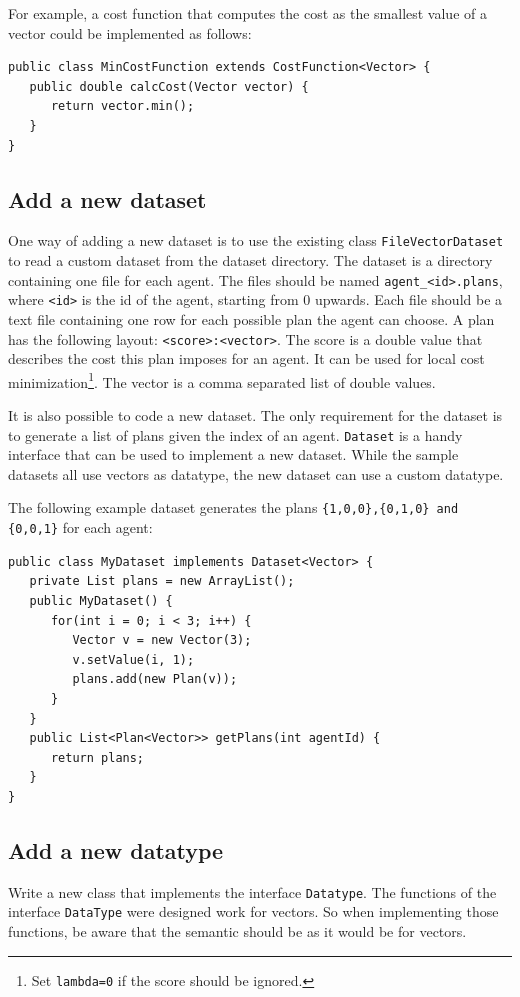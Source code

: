 \documentclass[11pt]{article} %
\newcommand{\code}{\texttt}
\begin{document}
For example, a cost function that computes the cost as the smallest value of a vector could be implemented as follows:
\begin{verbatim}
public class MinCostFunction extends CostFunction<Vector> {
   public double calcCost(Vector vector) {
      return vector.min();
   }
}
\end{verbatim}

\subsection{Add a new dataset} \label{sec:new_dataset}
One way of adding a new dataset is to use the existing class \code{FileVectorDataset} to read a custom dataset from the dataset directory. The dataset is a directory containing one file for each agent. The files should be named \code{agent\_<id>.plans}, where \code{<id>} is the id of the agent, starting from 0 upwards.
Each file should be a text file containing one row for each possible plan the agent can choose. A plan has the following layout: \code{<score>:<vector>}. The score is a double value that describes the cost this plan imposes for an agent. It can be used for local cost minimization\footnote{Set \code{lambda=0} if the score should be ignored.}. The vector is a comma separated list of double values.

It is also possible to code a new dataset. The only requirement for the dataset is to generate a list of plans given the index of an agent. \code{Dataset} is a handy interface that can be used to implement a new dataset. While the sample datasets all use vectors as datatype, the new dataset can use a custom datatype.

The following example dataset generates the plans \code{\{1,0,0\},\{0,1,0\} and \{0,0,1\}} for each agent:
\begin{verbatim}
public class MyDataset implements Dataset<Vector> {
   private List plans = new ArrayList();
   public MyDataset() {
      for(int i = 0; i < 3; i++) {
         Vector v = new Vector(3);
         v.setValue(i, 1);
         plans.add(new Plan(v));
      }
   }
   public List<Plan<Vector>> getPlans(int agentId) {
      return plans;
   }
}
\end{verbatim}

\subsection{Add a new datatype}
Write a new class that implements the interface \code{Datatype}. The functions of the interface \code{DataType} were designed work for vectors. So when implementing those functions, be aware that the semantic should be as it would be for vectors.
\end{document}
